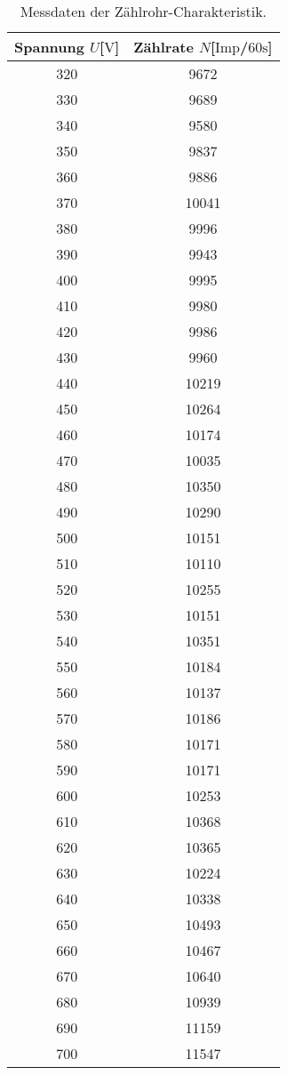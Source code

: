 \begin{table}
\centering
\caption{Messdaten der Zählrohr-Charakteristik.}
\label{tab:ogemessdaten}
\begin{tabular}{c c}
    \toprule
    Spannung $U$[$\si{\volt}$] & Zählrate $N$[$\text{Imp}$/$60\si{\second}$]\\
    \midrule
    320	& 9672 \\
    330	& 9689  \\
    340	& 9580  \\
    350	& 9837  \\
    360	& 9886  \\
    370	& 10041 \\
    380	& 9996\\
    390	& 9943\\
    400	& 9995\\
    410	& 9980\\
    420	& 9986\\
    430	& 9960\\
    440	& 10219\\
    450	& 10264\\
    460	& 10174\\
    470	& 10035\\
    480	& 10350\\
    490	& 10290\\
    500	& 10151\\
    510	& 10110\\
    520	& 10255\\
    530	& 10151\\
    540	& 10351\\
    550	& 10184\\
    560	& 10137\\
    570	& 10186\\
    580	& 10171\\
    590	& 10171\\
    600	& 10253\\
    610	& 10368\\
    620	& 10365\\
    630	& 10224\\
    640	& 10338\\
    650	& 10493\\
    660	& 10467\\
    670	& 10640\\
    680	& 10939\\
    690	& 11159\\
    700	& 11547\\
    \bottomrule
\end{tabular}
\end{table}